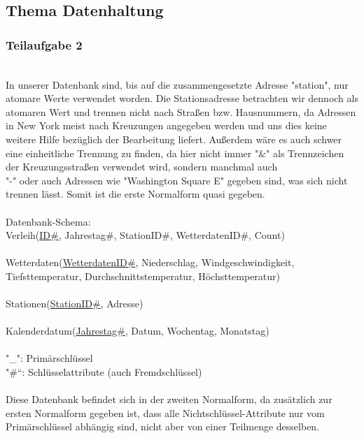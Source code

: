 \documentclass[a4paper,12pt]{article}
\begin{document}
\subsection{Thema Datenhaltung} 
\subsubsection{Teilaufgabe 2}\\ In unserer Datenbank sind, bis auf die zusammengesetzte Adresse "station", nur atomare Werte verwendet worden. Die Stationsadresse betrachten wir dennoch als atomaren Wert und trennen nicht nach Straßen bzw.  Hausnummern, da Adressen in New York meist nach Kreuzungen angegeben werden und uns dies keine weitere Hilfe bezüglich der Bearbeitung liefert. Außerdem wäre es auch schwer eine einheitliche Trennung zu finden, da hier nicht immer "\&" als Trennzeichen der Kreuzungsstraßen verwendet wird, sondern manchmal auch \\"-" oder auch Adressen wie "Washington Square E" gegeben sind, was sich nicht trennen lässt. Somit ist die erste Normalform quasi gegeben. \\ \\
Datenbank-Schema:\\
Verleih(\uline{ID\#}, Jahrestag\#, StationID\#, WetterdatenID\#, Count)\\ \\
Wetterdaten(\uline{WetterdatenID\#}, Niederschlag, Windgeschwindigkeit, Tiefsttemperatur, Durchschnittstemperatur, Höchsttemperatur)\\ \\
Stationen(\uline{StationID\#}, Adresse)\\ \\
Kalenderdatum(\uline{Jahrestag\#}, Datum, Wochentag, Monatstag)\\ \\
"\_": Primärschlüssel\\
"\#“: Schlüsselattribute (auch Fremdschlüssel)\\ \\
Diese Datenbank befindet sich in der zweiten Normalform, da zusätzlich zur ersten Normalform gegeben ist, dass alle Nichtschlüssel-Attribute nur vom Primärschlüssel abhängig sind, nicht aber von einer Teilmenge desselben. 
\\
\end{document}
